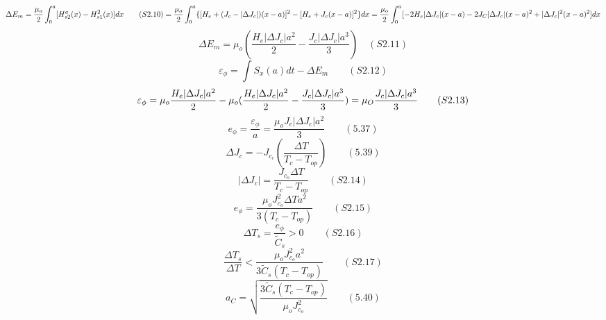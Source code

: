 \begin{equation}%
\Delta E_{m}=\frac{\mu_{o}}{2}\int_{0}^{a}[H_{s2}^{a}(x)-H_{s1}^{2}(x)]dx\qquad(S2.10)\\
=\frac{\mu_{o}}{2}\int_{0}^{a}\{[H_{e}+(J_{c}-|\Delta J_{c}|)(x-a)]^{2}-[H_{e}+J_{c}(x-a)]^{2}\}dx
=\frac{\mu_{o}}{2}\int_{0}^{a}[-2H_{e}|\Delta J_{c}|(x-a)-2J_{C}|\Delta J_{c}|(x-a)^{2}+|\Delta J_{c}|^{2}(x-a)^{2}]dx
\end{equation}
\begin{equation}%
\Delta E_{m}=\mu_{o}(\frac{H_{e}|\Delta J_{c}|a^{2}}{2}-\frac{J_{c}|\Delta J_{c}|a^{3}}{3})\quad(S2.11)
\end{equation}
\begin{equation}%
\varepsilon_{\phi}=\int S_{x}(a)dt-\Delta E_{m}\qquad(S2.12)
\end{equation}
\begin{equation}%
\varepsilon_{\phi}=\mu_{o}\frac{H_{e}|\Delta J_{c}|a^{2}}{2}-\mu_{o}(\frac{H_{e}|\Delta J_{c}|a^{2}}{2}-\frac{J_{c}|\Delta J_{c}|a^{3}}{3})\\
=\mu_{O}\frac{J_{c}|\Delta J_{c}|a^{3}}{3}\qquad(S2.13)
\end{equation}
\begin{equation}%
e_{\phi}=\frac{              \varepsilon_{\phi}}{a}=\frac{\mu_{o}J_{c}|\Delta J_{c}|a^{2}}{3}\qquad(5.37)
\end{equation}
\begin{equation}%
\Delta J_{c}=-J_{c_{c}}(\frac{\Delta T}{T_{c}-T_{op}})\qquad(5.39)
\end{equation}
\begin{equation}%
|\Delta J_{c}|=\frac{J_{c_{o}}\Delta T}{T_{c}-T_{op}}\qquad(S2.14)
\end{equation}
\begin{equation}%
e_{\phi}=\frac{\mu_{o}J_{c_{o}}^{2}\Delta T a^{2}}{3(T_{c}-T_{op})}\qquad(S2.15)
\end{equation}
\begin{equation}%
\Delta T_{s}=\frac{e_{\phi}}{\tilde{C}_{s}}>0\qquad(S2.16)
\end{equation}
\begin{equation}%
\frac{\Delta T_{s}}{\Delta T}<\frac{\mu_{o}J_{c_{o}}^{2}a^{2}}{3\tilde{C}_{s}(T_{c}-T_{op})}\qquad(S2.17)
\end{equation}
\begin{equation}%
a_{C}=\sqrt{\frac{3\tilde{C}_{s}(T_{c}-T_{op})}{\mu_{o}J_{c_{o}}^{2}}}\qquad(5.40)
\end{equation}
